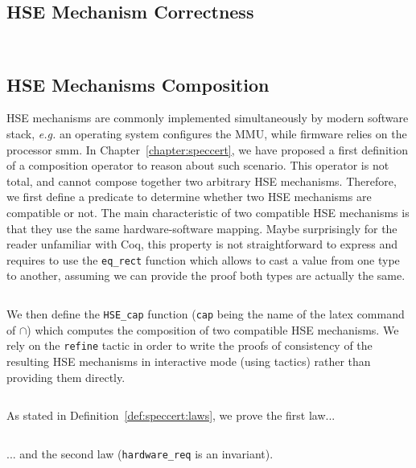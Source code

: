 \subsection{HSE Mechanism Correctness}

\inputminted[gobble=2,firstline=231,lastline=236]{coq}{Listings/SpecCert.v}

\inputminted[gobble=2,firstline=238,lastline=260]{coq}{Listings/SpecCert.v}

\subsection{HSE Mechanisms Composition}

HSE mechanisms are commonly implemented simultaneously by modern software stack,
\emph{e.g.} an operating system configures the MMU, while firmware relies on the
processor \ac{smm}.
%
In Chapter~\ref{chapter:speccert}, we have proposed a first definition of a
composition operator to reason about such scenario.
%
This operator is not total, and cannot compose together two arbitrary HSE
mechanisms.
%
Therefore, we first define a predicate to determine whether two HSE mechanisms
are compatible or not.
%
The main characteristic of two compatible HSE mechanisms is that they use the
same hardware-software mapping.
%
Maybe surprisingly for the reader unfamiliar with Coq, this property is not
straightforward to express and requires to use the \texttt{eq\_rect} function
which allows to cast a value from one type to another, assuming we can provide
the proof both types are actually the same.

\inputminted[gobble=2,firstline=401,lastline=407]{coq}{Listings/SpecCert.v}

We then define the \texttt{HSE\_cap} function (\texttt{cap} being the name of
the latex command of \( \cap\)) which computes the composition of two compatible
HSE mechanisms. We rely on the \texttt{refine} tactic in order to write the
proofs of consistency of the resulting HSE mechanisms in interactive mode (using
tactics) rather than providing them directly.

\inputminted[gobble=2,firstline=409,lastline=423]{coq}{Listings/SpecCert.v}

As stated in Definition~\ref{def:speccert:laws}, we prove the first law...

\inputminted[gobble=2,firstline=429,lastline=445]{coq}{Listings/SpecCert.v}

... and the second law (\texttt{hardware\_req} is an invariant).

